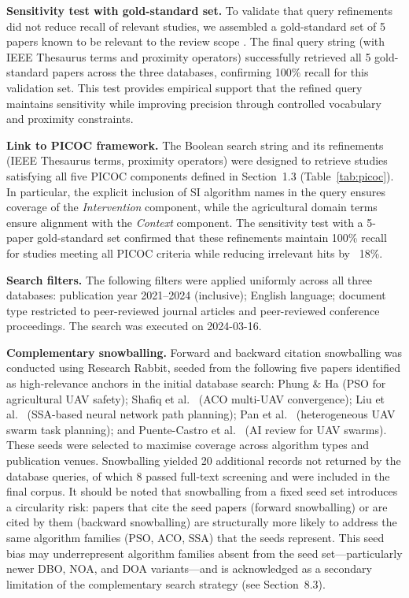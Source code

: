 \documentclass[review,3p,times]{elsarticle}
\begin{document}
\textbf{Sensitivity test with gold-standard set.} To validate that query refinements did not reduce recall of relevant studies, we assembled a gold-standard set of 5 papers known to be relevant to the review scope \cite{phung2021,shafiq2022,liu2021,pan2022,puente2022}. The final query string (with IEEE Thesaurus terms and proximity operators) successfully retrieved all 5 gold-standard papers across the three databases, confirming 100\% recall for this validation set. This test provides empirical support that the refined query maintains sensitivity while improving precision through controlled vocabulary and proximity constraints.

\textbf{Link to PICOC framework.} The Boolean search string and its refinements (IEEE Thesaurus terms, proximity operators) were designed to retrieve studies satisfying all five PICOC components defined in Section~1.3 (Table~\ref{tab:picoc}). In particular, the explicit inclusion of SI algorithm names in the query ensures coverage of the \textit{Intervention} component, while the agricultural domain terms ensure alignment with the \textit{Context} component. The sensitivity test with a 5-paper gold-standard set confirmed that these refinements maintain 100\% recall for studies meeting all PICOC criteria while reducing irrelevant hits by ~18\%.

\textbf{Search filters.} The following filters were applied uniformly across all three databases: publication year 2021--2024 (inclusive); English language; document type restricted to peer-reviewed journal articles and peer-reviewed conference proceedings. The search was executed on 2024-03-16.

\textbf{Complementary snowballing.} Forward and backward citation snowballing was conducted using Research Rabbit, seeded from the following five papers identified as high-relevance anchors in the initial database search: Phung \& Ha \cite{phung2021} (PSO for agricultural UAV safety); Shafiq et al.\ \cite{shafiq2022} (ACO multi-UAV convergence); Liu et al.\ \cite{liu2021} (SSA-based neural network path planning); Pan et al.\ \cite{pan2022} (heterogeneous UAV swarm task planning); and Puente-Castro et al.\ \cite{puente2022} (AI review for UAV swarms). These seeds were selected to maximise coverage across algorithm types and publication venues. Snowballing yielded 20 additional records not returned by the database queries, of which 8 passed full-text screening and were included in the final corpus. It should be noted that snowballing from a fixed seed set introduces a circularity risk: papers that cite the seed papers (forward snowballing) or are cited by them (backward snowballing) are structurally more likely to address the same algorithm families (PSO, ACO, SSA) that the seeds represent. This seed bias may underrepresent algorithm families absent from the seed set---particularly newer DBO, NOA, and DOA variants---and is acknowledged as a secondary limitation of the complementary search strategy (see Section~8.3).
\end{document}
